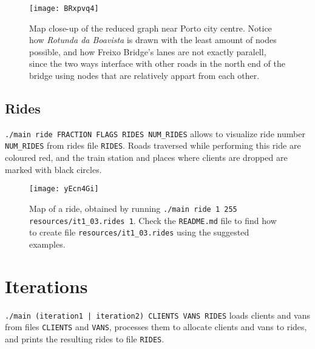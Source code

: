 \begin{figure}[H]
    \centering
    \texttt{[image: BRxpvq4]}
    \caption[Map close-up of the reduced graph near Porto city centre]{Map close-up of the reduced graph near Porto city centre. Notice how \emph{Rotunda da Boavista} is drawn with the least amount of nodes possible, and how Freixo Bridge's lanes are not exactly paralell, since the two ways interface with other roads in the north end of the bridge using nodes that are relatively appart from each other.}
\end{figure}

\subsection{Rides}
\texttt{./main ride FRACTION FLAGS RIDES NUM\_RIDES} allows to visualize ride number \texttt{NUM\_RIDES} from rides file \texttt{RIDES}. Roads traversed while performing this ride are coloured red, and the train station and places where clients are dropped are marked with black circles.

\begin{figure}[H]
    \centering
    \texttt{[image: yEcn4Gi]}
    \caption[Map of a ride]{Map of a ride, obtained by running \texttt{./main ride 1 255 resources/it1\_03.rides 1}. Check the \texttt{README.md} file to find how to create file \texttt{resources/it1\_03.rides} using the suggested examples.}
\end{figure}

\section{Iterations}
\texttt{./main (iteration1 | iteration2) CLIENTS VANS RIDES} loads clients and vans from files \texttt{CLIENTS} and \texttt{VANS}, processes them to allocate clients and vans to rides, and prints the resulting rides to file \texttt{RIDES}. 
